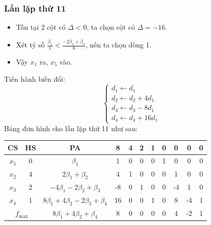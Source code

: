 \documentclass[12pt]{article}
\begin{document}
\subsubsection{Lần lặp thứ 11}
\begin{itemize}
\item Tồn tại 2 cột có $\Delta < 0$, ta chọn cột có $\Delta = -16$.
\item Xét tỷ số $\displaystyle \frac{\beta_1}{1} < \frac{-2\beta_1 + \beta_2}{8}$, nên ta chọn dòng 1.
\item Vậy $x_1$ ra, $x_5$ vào.
\end{itemize}
Tiến hành biến đổi:
$$
\left\{
\begin{array}{lll}
d_1 \leftarrow d_1 \\
d_2 \leftarrow d_2 + 4d_1\\
d_3 \leftarrow d_3 - 8d_1\\
d_4 \leftarrow d_4 + 16d_1
\end{array}
\right.
$$
Bảng đơn hình cho lần lặp thứ 11 như sau:
\begin{table}[H]
\centering
\begin{tabular}{|c|c|c|c|c|c|c|c|c|c|c|}
\hline
CS & HS & PA & 8 & 4 & 2 & 1 & 0 & 0 & 0 & 0 \\
\hline
$x_5$ & 0 & $\beta_1$ & 1 & 0 & 0 & 0 & 1 & 0 & 0 & 0 \\
$x_2$ & 4 & $2\beta_1 + \beta_2$ & 4 & 1 & 0 & 0 & 0 & 1 & 0 & 0 \\
$x_3$ & 2 & $-4\beta_1 - 2\beta_2 + \beta_3$ & -8 & 0 & 1 & 0 & 0 & -4 & 1 & 0 \\
$x_4$ & 1 & $8\beta_1 + 4\beta_2 - 2\beta_3 + \beta_4$ & 16 & 0 & 0 & 1 & 0 & 8 & -4 & 1 \\
\hline
\multicolumn{2}{|c|}{$f_{\max}$}
& $8\beta_1 + 4\beta_2 + \beta_4$ & 8 & 0 & 0 & 0 & 0 & 4 & -2 & 1 \\
\hline
\end{tabular}
\end{table}
\end{document}
